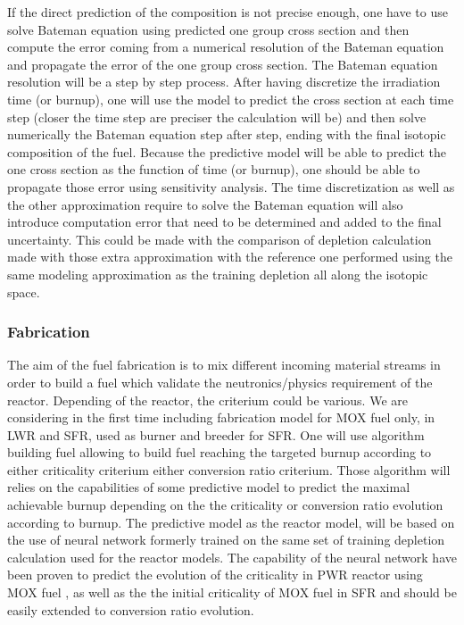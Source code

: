 \documentclass[dvips,12pt]{article}
\begin{document}
If the direct prediction of the composition is not precise enough, one have to use solve Bateman equation using predicted one group cross section and then compute the error coming from a numerical resolution of the Bateman equation and propagate the error of the one group cross section. 
The Bateman equation resolution will be a step by step process. After having discretize the irradiation time (or burnup), one will use the model to predict the cross section at each time step (closer the time step are preciser the calculation will be) and then solve numerically the Bateman equation step after step, ending with the final isotopic composition of the fuel. Because the predictive model will be able to predict the one cross section as the function of time (or burnup), one should be able to propagate those error using sensitivity analysis.
The time discretization as well as the other approximation require to solve the Bateman equation will also introduce computation error that need to be determined and added to the final uncertainty. This could be made with the comparison of depletion calculation made with those extra approximation with the reference one performed using the same modeling approximation as the training depletion all along the isotopic space.



\subsubsection{Fabrication} \label{sec:fabrication}
The aim of the fuel fabrication is to mix different incoming material streams in order to build a fuel which validate the neutronics/physics requirement of the reactor. Depending of the reactor, the criterium could be various. We are considering in the first time including fabrication model for MOX fuel only, in LWR and SFR, used as burner and breeder for SFR. One will use algorithm building fuel allowing to build fuel reaching the targeted burnup according to either criticality criterium either conversion ratio criterium.  
Those algorithm will relies on the capabilities of some predictive model to predict the maximal achievable burnup depending on the the criticality or conversion ratio evolution according to burnup.
The predictive model as the reactor model, will be based on the use of neural network formerly trained on the same set of training depletion calculation used for the reactor models. The capability of the neural network have been proven to predict the evolution of the criticality in PWR reactor using MOX fuel \cite{Leniaux.NN, CLASS UserManual}, as well as the the initial criticality of MOX fuel in SFR \cite{CLASS UserManual} and should be easily extended to conversion ratio evolution.
\end{document}
